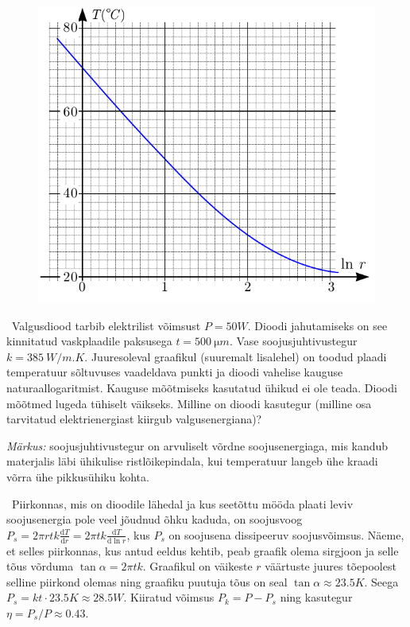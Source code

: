 
\begin{figure}
	\vspace{-20pt}
	\begin{center}
		\includegraphics[width = \linewidth]{2018-lahg-09-yl.pdf}
	\end{center}
\end{figure}

\
Valgusdiood tarbib elektrilist võimsust $P=\SI{50}W$. Dioodi jahutamiseks on see kinnitatud vaskplaadile paksusega $t=\SI{500}{\micro m}$. Vase soojusjuhtivustegur $k=\SI{385}{W/m.K}$. Juuresoleval graafikul (suuremalt lisalehel) on toodud plaadi temperatuur sõltuvuses vaadeldava punkti ja dioodi vahelise kauguse naturaallogaritmist. Kauguse mõõtmiseks kasutatud ühikud ei ole teada. Dioodi mõõtmed lugeda tühiselt väikseks. Milline on dioodi kasutegur (milline osa tarvitatud elektrienergiast kiirgub valgusenergiana)?

\textit{Märkus:} soojusjuhtivustegur on arvuliselt võrdne soojusenergiaga, mis kandub materjalis läbi ühikulise ristlõikepindala, kui temperatuur langeb ühe kraadi võrra ühe pikkusühiku kohta.\hint

\solu
\
Piirkonnas, mis on dioodile lähedal ja kus seetõttu mööda plaati leviv soojusenergia pole veel jõudnud õhku kaduda, on soojusvoog $P_s=2\pi rtk \frac{\mathrm d T}{\mathrm d r}=2\pi tk \frac{\mathrm d T}{\mathrm d \ln r}$, kus $P_s$ on soojusena dissipeeruv soojusvõimsus. Näeme, et selles piirkonnas, kus antud eeldus kehtib, peab graafik olema sirgjoon ja selle tõus võrduma $\tan\alpha=2\pi tk$. Graafikul on väikeste $r$ väärtuste juures tõepoolest selline piirkond olemas ning graafiku puutuja tõus on seal $\tan\alpha\approx\SI{23.5}K$. Seega $P_s=kt\cdot \SI{23.5}K\approx \SI{28.5}W$. Kiiratud võimsus $P_k=P-P_s$ ning kasutegur $\eta=P_s/P\approx 0.43$.
\probend